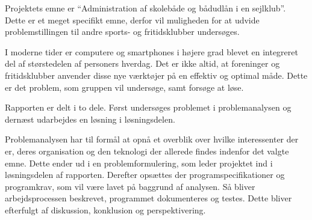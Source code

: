 Projektets emne er ``Administration af skolebåde og bådudlån i en sejlklub''.
Dette er et meget specifikt emne, derfor vil muligheden for at udvide problemstillingen til andre sports- og fritidsklubber undersøges.

I moderne tider er computere og smartphones i højere grad blevet en integreret del af størstedelen af personers hverdag.  \citep{dstSPogPC} 
Det er ikke altid, at foreninger og fritidsklubber anvender disse nye værktøjer på en effektiv og optimal måde. 
Dette er det problem, som gruppen vil undersøge, samt forsøge at løse.

Rapporten er delt i to dele. 
Først undersøges problemet i problemanalysen og dernæst udarbejdes en løsning i løsningsdelen.

Problemanalysen har til formål at opnå et overblik over hvilke interessenter der er, deres organisation og den teknologi der allerede findes indenfor det valgte emne. 
Dette ender ud i en problemformulering, som leder projektet ind i løsningsdelen af rapporten. 
Derefter opsættes der programspecifikationer og programkrav, som vil være lavet på baggrund af analysen. 
Så bliver arbejdsprocessen beskrevet, programmet dokumenteres og testes. 
Dette bliver efterfulgt af diskussion, konklusion og perspektivering.

